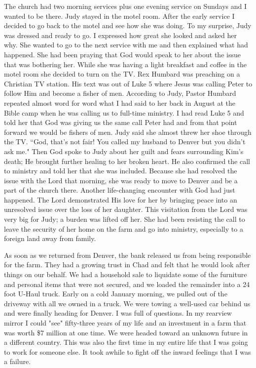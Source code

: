 \documentclass[oneside]{book}
\begin{document}
The church had two morning services plus one evening service on Sundays and I wanted to be there. Judy stayed in the motel room. After the early service I decided to go back to the motel and see how she was doing. To my surprise, Judy was dressed and ready to go. I expressed how great she looked and asked her why. She wanted to go to the next service with me and then explained what had happened. She had been praying that God would speak to her about the issue that was bothering her. While she was having a light breakfast and coffee in the motel room she decided to turn on the TV. Rex Humbard was preaching on a Christian TV station. His text was out of Luke 5 where Jesus was calling Peter to follow Him and become a fisher of men. According to Judy, Pastor Humbard repeated almost word for word what I had said to her back in August at the Bible camp when he was calling us to full-time ministry. I had read Luke 5 and told her that God was giving us the same call Peter had and from that point forward we would be fishers of men. Judy said she almost threw her shoe through the TV. ``God, that's not fair! You called my husband to Denver but you didn't ask me." Then God spoke to Judy about her guilt and fears surrounding Kim's death; He brought further healing to her broken heart. He also confirmed the call to ministry and told her that she was included. Because she had resolved the issue with the Lord that morning, she was ready to move to Denver and be a part of the church there. Another life-changing encounter with God had just happened. The Lord demonstrated His love for her by bringing peace into an unresolved issue over the loss of her daughter. This visitation from the Lord was very big for Judy; a burden was lifted off her. She had been resisting the call to leave the security of her home on the farm and go into ministry, especially to a foreign land away from family.

As soon as we returned from Denver, the bank released us from being responsible for the farm. They had a growing trust in Chad and felt that he would look after things on our behalf. We had a household sale to liquidate some of the furniture and personal items that were not secured, and we loaded the remainder into a 24 foot U-Haul truck. Early on a cold January morning, we pulled out of the driveway with all we owned in a truck. We were towing a well-used car behind us and were finally heading for Denver. I was full of questions. In my rearview mirror I could "see" fifty-three years of my life and an investment in a farm that was worth \$7 million at one time. We were headed toward an unknown future in a different country. This was also the first time in my entire life that I was going to work for someone else. It took awhile to fight off the inward feelings that I was a failure.
\end{document}
